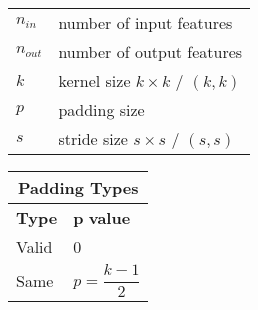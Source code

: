 \begin{table}[h]
    \begin{minipage}[t]{0.5\linewidth}
        \begin{table}[H]
            \begin{tabular}{l l}
                $n_{in}$ & number of input features \\
                $n_{out}$ & number of output features \\
                $k$ & kernel size $k\times k$ / $(k, k)$ \\
                $p$ & padding size \\
                $s$ & stride size $s\times s$ / $(s, s)$ \\
            \end{tabular}
        \end{table}        
    \end{minipage}
    \hfill
    \begin{minipage}[t]{0.5\linewidth}
        \begin{table}[H]
            \begin{tabular}{l|l}
                \multicolumn{2}{c}{Padding Types}\\ \hline
                \textbf{Type} & $\mathbf{p}$ \textbf{value} \\ \hline
                Valid & 0 \\
                Same & \( \displaystyle p = \dfrac{k - 1}{2} \) \\
                
            \end{tabular}
        \end{table}        
    \end{minipage}
\end{table}







